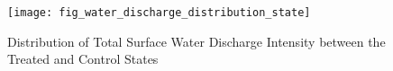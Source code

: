 \begin{figure}[H]
    \centering
    \texttt{[image: fig\_water\_discharge\_distribution\_state]}
    \caption{Distribution of Total Surface Water Discharge Intensity between the Treated and Control States}
    \label{fig:water-discharge-distribution}
\end{figure}